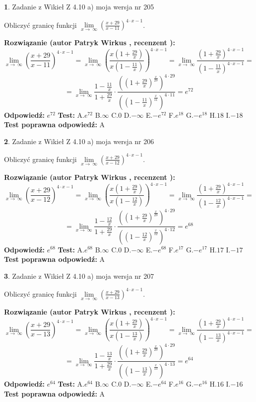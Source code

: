 \documentclass[12pt, a4paper]{article}
\theoremstyle{definition} %
\newtheorem{zad}{}
\newcommand{\zadStart}[1]{\begin{zad}#1\newline}
\newcommand{\zadStop}{\end{zad}}
\newcommand{\rozwStart}[2]{\noindent \textbf{Rozwiązanie (autor #1 , recenzent #2): }\newline}
\newcommand{\rozwStop}{\newline}
\newcommand{\odpStart}{\noindent \textbf{Odpowiedź:}\newline}
\newcommand{\odpStop}{\newline}
\newcommand{\testStart}{\noindent \textbf{Test:}\newline}
\newcommand{\testStop}{\newline}
\newcommand{\kluczStart}{\noindent \textbf{Test poprawna odpowiedź:}\newline}
\newcommand{\kluczStop}{\newline}
\begin{document}
\zadStart{Zadanie z Wikieł Z 4.10 a) moja wersja nr 205}

Obliczyć granicę funkcji  $\lim\limits_{x\to\ \infty}(\frac{x+29}{x-11})^{4\cdot x-1}$.
\zadStop
\rozwStart{Patryk Wirkus}{}
$$\lim\limits_{x\to\ \infty}(\frac{x+29}{x-11})^{4\cdot x-1} = \lim\limits_{x\to\ \infty}(\frac{x(1+\frac{29}{x})}{x(1-\frac{11}{x})})^{4\cdot x-1}=\lim\limits_{x\to\ \infty}\frac{(1+\frac{29}{x})^{4\cdot x-1}}{(1-\frac{11}{x})^{4\cdot x-1}}=$$
$$=\lim\limits_{x\to\ \infty}\frac{1-\frac{11}{x}}{1+\frac{29}{x}}\cdot\frac{((1+\frac{29}{x})^{\frac{x}{29}})^{4\cdot29}}{((1-\frac{11}{x})^{\frac{x}{11}})^{4\cdot11}}=e^{72}$$
\rozwStop
\odpStart
$e^{72}$
\odpStop
\testStart
A.$e^{72}$ B.$\infty$ C.$0$ D.$-\infty$ E.$-e^{72}$
F.$e^{18}$ G.$-e^{18}$
H.$18$
I.$-18$
\testStop
\kluczStart
A
\kluczStop



\zadStart{Zadanie z Wikieł Z 4.10 a) moja wersja nr 206}

Obliczyć granicę funkcji  $\lim\limits_{x\to\ \infty}(\frac{x+29}{x-12})^{4\cdot x-1}$.
\zadStop
\rozwStart{Patryk Wirkus}{}
$$\lim\limits_{x\to\ \infty}(\frac{x+29}{x-12})^{4\cdot x-1} = \lim\limits_{x\to\ \infty}(\frac{x(1+\frac{29}{x})}{x(1-\frac{12}{x})})^{4\cdot x-1}=\lim\limits_{x\to\ \infty}\frac{(1+\frac{29}{x})^{4\cdot x-1}}{(1-\frac{12}{x})^{4\cdot x-1}}=$$
$$=\lim\limits_{x\to\ \infty}\frac{1-\frac{12}{x}}{1+\frac{29}{x}}\cdot\frac{((1+\frac{29}{x})^{\frac{x}{29}})^{4\cdot29}}{((1-\frac{12}{x})^{\frac{x}{12}})^{4\cdot12}}=e^{68}$$
\rozwStop
\odpStart
$e^{68}$
\odpStop
\testStart
A.$e^{68}$ B.$\infty$ C.$0$ D.$-\infty$ E.$-e^{68}$
F.$e^{17}$ G.$-e^{17}$
H.$17$
I.$-17$
\testStop
\kluczStart
A
\kluczStop



\zadStart{Zadanie z Wikieł Z 4.10 a) moja wersja nr 207}

Obliczyć granicę funkcji  $\lim\limits_{x\to\ \infty}(\frac{x+29}{x-13})^{4\cdot x-1}$.
\zadStop
\rozwStart{Patryk Wirkus}{}
$$\lim\limits_{x\to\ \infty}(\frac{x+29}{x-13})^{4\cdot x-1} = \lim\limits_{x\to\ \infty}(\frac{x(1+\frac{29}{x})}{x(1-\frac{13}{x})})^{4\cdot x-1}=\lim\limits_{x\to\ \infty}\frac{(1+\frac{29}{x})^{4\cdot x-1}}{(1-\frac{13}{x})^{4\cdot x-1}}=$$
$$=\lim\limits_{x\to\ \infty}\frac{1-\frac{13}{x}}{1+\frac{29}{x}}\cdot\frac{((1+\frac{29}{x})^{\frac{x}{29}})^{4\cdot29}}{((1-\frac{13}{x})^{\frac{x}{13}})^{4\cdot13}}=e^{64}$$
\rozwStop
\odpStart
$e^{64}$
\odpStop
\testStart
A.$e^{64}$ B.$\infty$ C.$0$ D.$-\infty$ E.$-e^{64}$
F.$e^{16}$ G.$-e^{16}$
H.$16$
I.$-16$
\testStop
\kluczStart
A
\kluczStop
\end{document}
